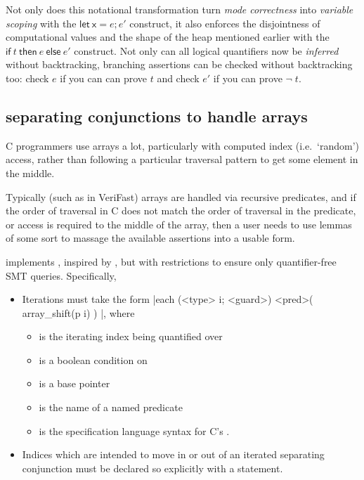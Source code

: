 Not only does this notational transformation turn \emph{mode correctness} into
\emph{variable scoping} with the $\mathsf{let\ x} = e; e'$ construct, it also
enforces the disjointness of computational values and the shape of the heap
mentioned earlier with the $\mathsf{if}\ t\ \mathsf{then}\ e\ \mathsf{else}\
e'$ construct. Not only can all logical quantifiers now be \emph{inferred}
without backtracking, branching assertions can be checked without backtracking
too: check $e$ if you can can prove $t$ and check $e'$ if you can prove
$\neg\;t$.

\subsection{ separating conjunctions to handle arrays}\label{sec:it-array}

C programmers use arrays a lot, particularly with computed index (i.e.\
`random') access, rather than following a particular traversal pattern to get
some element in the middle.

Typically (such as in VeriFast) arrays are handled via recursive predicates,
and if the order of traversal in C does not match the order of traversal in the
predicate, or access is required to the middle of the array, then a user needs
to use lemmas of some sort to massage the available assertions into a usable
form.

 implements , inspired by
, but with restrictions to ensure only
quantifier-free SMT queries. Specifically,
\begin{itemize}
    \item Iterations must take the form
        \cninline[breaklines]|each (<type> i; <guard>) { <pred>( array_shift(p i) ) }|, %
        where
        \begin{itemize}
            \item {} is the iterating index being quantified over
            \item {} is a boolean condition on 
            \item \cninline{p} is a base pointer
            \item \cninline{<pred>} is the name of a named predicate
            \item \cninline{array_shift} is the specification language syntax
                for C's \cinline{p + i}.
        \end{itemize}
    \item Indices which are intended to move in or out of an iterated separating
        conjunction must be declared so explicitly with a 
        statement.
\end{itemize}


